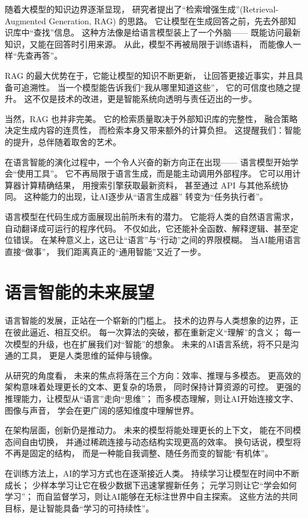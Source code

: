 随着大模型的知识边界逐渐显现，  
研究者提出了“检索增强生成”(Retrieval-Augmented Generation, RAG) 的思路。  
它让模型在生成回答之前，先去外部知识库中“查找”信息。  
这种方法像是给语言模型装上了一个外脑——  
既能访问最新知识，又能在回答时引用来源。  
从此，模型不再被局限于训练语料，  
而能像人一样“先查再答”。  

RAG 的最大优势在于，它能让模型的知识不断更新，  
让回答更接近事实，并且具备可追溯性。  
当一个模型能告诉我们“我从哪里知道这些”，  
它的可信度也随之提升。  
这不仅是技术的改进，更是智能系统向透明与责任迈出的一步。  

当然，RAG 也并非完美。  
它的检索质量取决于外部知识库的完整性，  
融合策略决定生成内容的连贯性，  
而检索本身又带来额外的计算负担。  
这提醒我们：智能的提升，总伴随着取舍的艺术。  

在语言智能的演化过程中，一个令人兴奋的新方向正在出现——  
语言模型开始学会“使用工具”。  
它不再局限于语言生成，而是能主动调用外部程序。  
它可以用计算器计算精确结果，  
用搜索引擎获取最新资料，  
甚至通过 API 与其他系统协同。  
这种能力的出现，让AI逐步从“语言生成器”  
转变为“任务执行者”。  

语言模型在代码生成方面展现出前所未有的潜力。  
它能将人类的自然语言需求，  
自动翻译成可运行的程序代码。  
不仅如此，它还能补全函数、解释逻辑、甚至定位错误。  
在某种意义上，这已让“语言”与“行动”之间的界限模糊。  
当AI能用语言直接“做事”，  
我们距离真正的“通用智能”又近了一步。  

\section{语言智能的未来展望}

语言智能的发展，正站在一个崭新的门槛上。  
技术的边界与人类想象的边界，正在彼此逼近、相互交织。  
每一次算法的突破，都在重新定义“理解”的含义；  
每一次模型的升级，也在扩展我们对“智能”的想象。  
未来的AI语言系统，将不只是沟通的工具，  
更是人类思维的延伸与镜像。  

从研究的角度看，  
未来的焦点将落在三个方向：效率、推理与多模态。  
更高效的架构意味着处理更长的文本、更复杂的场景，  
同时保持计算资源的可控。  
更强的推理能力，让模型从“语言”走向“思维”；  
而多模态理解，则让AI开始连接文字、图像与声音，  
学会在更广阔的感知维度中理解世界。  

在架构层面，创新仍是推动力。  
未来的模型将能处理更长的上下文，  
能在不同模态间自由切换，  
并通过稀疏连接与动态结构实现更高的效率。  
换句话说，模型将不再是固定的结构，  
而是一种能自我调整、随任务而变的智能“有机体”。  

在训练方法上，AI的学习方式也在逐渐接近人类。  
持续学习让模型在时间中不断成长；  
少样本学习让它在极少数据下迅速掌握新任务；  
元学习则让它“学会如何学习”；  
而自监督学习，则让AI能够在无标注世界中自主探索。  
这些方法的共同目标，是让智能具备“学习的可持续性”。  

